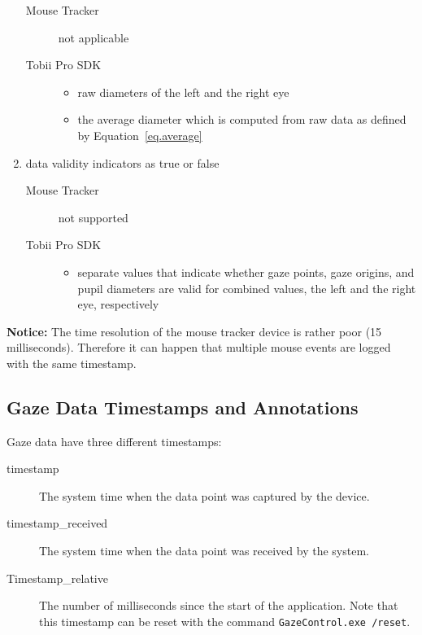 \documentclass[a4paper,oneside]{book}
\begin{document}
\begin{enumerate}
\begin{description}
            \item[Mouse Tracker] not applicable
            \item[Tobii Pro SDK] \hfill
                \begin{itemize}
                    \item raw diameters of the left and the right eye
                    \item the average diameter which is computed from raw data as defined by Equation~\ref{eq.average}
                \end{itemize}
        \end{description}
    \item data validity indicators as true or false
        \begin{description}
            \item[Mouse Tracker] not supported
            \item[Tobii Pro SDK] \hfill
                \begin{itemize}
                    \item separate values that indicate whether gaze points, gaze origins, and pupil diameters are valid for combined values, the left and the right eye, respectively
                \end{itemize}
        \end{description}
\end{enumerate}

\begin{mdframed}[backgroundcolor=boxbkg]\textbf{\color{orange}Notice:}
    The time resolution of the mouse tracker device is rather poor (15 milliseconds).
    Therefore it can happen that multiple mouse events are logged with the same timestamp.
\end{mdframed}

\subsection{Gaze Data Timestamps and Annotations}
\label{sect.data.annotations}
Gaze data have three different timestamps:
\begin{description}
    \item[timestamp] The system time when the data point was captured by the device.
    \item[timestamp\_received] The system time when the data point was received by the system.
    \item[Timestamp\_relative] The number of milliseconds since the start of the application.
        Note that this timestamp can be reset with the command \texttt{GazeControl.exe /reset}.
\end{description}
\end{document}
